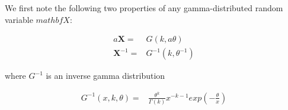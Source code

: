 
We first note the following two properties of any gamma-distributed random variable $mathbf{X}$: 

\begin{eqnarray}
a \mathbf{X} =& G(k,a \theta ) \\
\mathbf{X}^{-1} =& G^{-1}(k,\theta^{-1} )
\end{eqnarray}

where $G^{-1}$ is an inverse gamma distribution

\begin{eqnarray}
G^{-1}(x,k,\theta) =& \frac{\displaystyle \theta^{k}}{ \Gamma(k)} x^{-k-1} exp(- \frac{\displaystyle \theta}{x})
\end{eqnarray}
